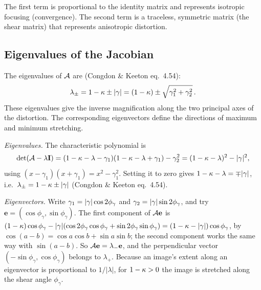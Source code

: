 The first term is proportional to the identity matrix and represents
isotropic focusing (convergence).  The second term is a traceless,
symmetric matrix (the shear matrix) that represents anisotropic
distortion.

\subsection{Eigenvalues of the Jacobian}

The eigenvalues of $\mathcal{A}$ are
(Congdon \& Keeton eq.~4.54):
\begin{equation}
    \lambda_\pm = 1 - \kappa \pm |\gamma|
    = (1 - \kappa) \pm \sqrt{\gamma_1^2 + \gamma_2^2} \,.
    \label{eq:eigenvalues}
\end{equation}
These eigenvalues give the inverse magnification along the two
principal axes of the distortion.  The corresponding eigenvectors
define the directions of maximum and minimum stretching.
\begin{derivation}
\emph{Eigenvalues.} The characteristic polynomial is
\begin{equation*}
    \det(\mathcal{A} - \lambda\mathbf{I})
    = (1 - \kappa - \lambda - \gamma_1)(1 - \kappa - \lambda + \gamma_1) - \gamma_2^2
    = (1 - \kappa - \lambda)^2 - |\gamma|^2 ,
\end{equation*}
using $(x - \gamma_1)(x + \gamma_1) = x^2 - \gamma_1^2$. Setting it to zero
gives $1 - \kappa - \lambda = \mp|\gamma|$, i.e.\ $\lambda_\pm = 1 - \kappa \pm |\gamma|$
(Congdon \& Keeton eq.~4.54).

\emph{Eigenvectors.} Write $\gamma_1 = |\gamma|\cos2\phi_\gamma$ and
$\gamma_2 = |\gamma|\sin2\phi_\gamma$, and try $\mathbf{e} = (\cos\phi_\gamma, \sin\phi_\gamma)$.
The first component of $\mathcal{A}\mathbf{e}$ is
$(1-\kappa)\cos\phi_\gamma - |\gamma|(\cos2\phi_\gamma\cos\phi_\gamma + \sin2\phi_\gamma\sin\phi_\gamma)
= (1 - \kappa - |\gamma|)\cos\phi_\gamma$, by
$\cos(a - b) = \cos a\cos b + \sin a\sin b$; the second component works the
same way with $\sin(a - b)$. So $\mathcal{A}\mathbf{e} = \lambda_-\mathbf{e}$, and
the perpendicular vector $(-\sin\phi_\gamma, \cos\phi_\gamma)$ belongs to
$\lambda_+$. Because an image's extent along an eigenvector is proportional to
$1/|\lambda|$, for $1 - \kappa > 0$ the image is stretched along the
shear angle $\phi_\gamma$.
\end{derivation}



